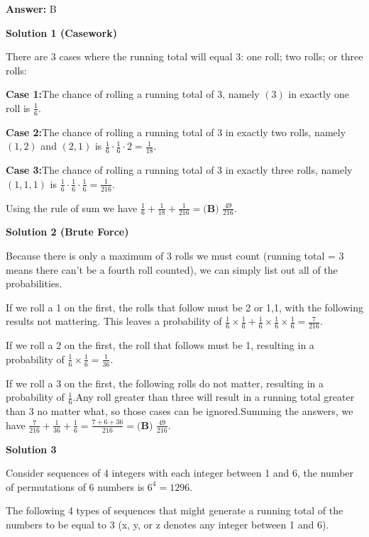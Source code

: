 \begin{enumerate}
 \textbf{Answer: }B



\textbf{Solution 1 (Casework)}

There are $3$ cases where the running total will equal $3$: one roll; two rolls; or three rolls:

 \textbf{Case 1:}The chance of rolling a running total of $3$, namely $(3)$ in exactly one roll is $\frac{1}{6}$.

 \textbf{Case 2:}The chance of rolling a running total of $3$ in exactly two rolls, namely $(1, 2)$ and $(2, 1)$ is $\frac{1}{6}\cdot\frac{1}{6}\cdot2=\frac{1}{18}$.

 \textbf{Case 3:}The chance of rolling a running total of 3 in exactly three rolls, namely $(1, 1, 1)$ is $\frac{1}{6}\cdot\frac{1}{6}\cdot\frac{1}{6}=\frac{1}{216}$.

 Using the rule of sum we have $\frac{1}{6}+\frac{1}{18}+\frac{1}{216}=\boxed{\textbf{(B) }\frac{49}{216}}$.

 



\textbf{Solution 2 (Brute Force)}

Because there is only a maximum of 3 rolls we must count (running total = 3 means there can't be a fourth roll counted), we can simply list out all of the probabilities.

 If we roll a 1 on the first, the rolls that follow must be 2 or {1,1}, with the following results not mattering. This leaves a probability of $\frac{1}{6}\times\frac{1}{6} + \frac{1}{6}\times\frac{1}{6}\times\frac{1}{6} = \frac{7}{216}$.

 If we roll a 2 on the first, the roll that follows must be 1, resulting in a probability of $\frac{1}{6}\times\frac{1}{6} = \frac{1}{36}$.

 If we roll a 3 on the first, the following rolls do not matter, resulting in a probability of $\frac{1}{6}$.Any roll greater than three will result in a running total greater than 3 no matter what, so those cases can be ignored.Summing the answers, we have $\frac{7}{216} + \frac{1}{36} + \frac{1}{6} = \frac{7+6+36}{216} = \boxed{\textbf{(B) }\frac{49}{216}}$.

 



\textbf{Solution 3}

Consider sequences of 4 integers with each integer between 1 and 6, the number of permutations of 6 numbers is $6^4=1296$. 

 The following 4 types of sequences that might generate a running total of the numbers to be equal to 3 (x, y, or z denotes any integer between 1 and 6).


\end{enumerate}
